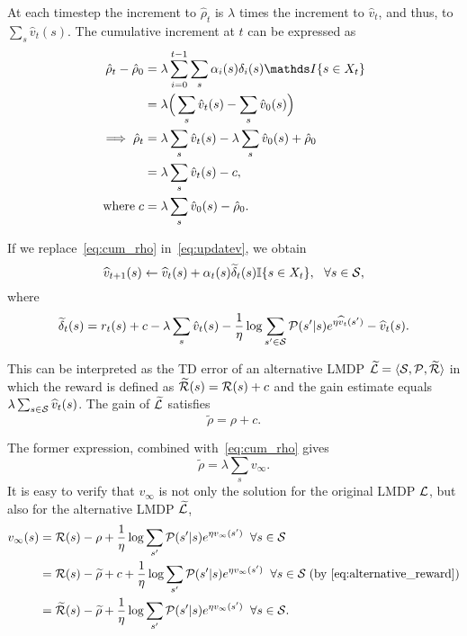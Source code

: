 At each timestep the increment to $\hat\rho_t$ is $\lambda$ times the increment to $\hat v_t$, and thus, to $\sum_s \hat v_t(s)$. The cumulative increment at $t$ can be expressed as
\begin{align}
     \hat\rho_t - \hat\rho_0 &= \lambda \sum_{i=0}^{t-1}\sum_s \alpha_i(s)\delta_i(s) \indicator{s\in X_t}\nonumber\\
                   &= \lambda \Big(\sum_s\hat v_t(s) - \sum_s\hat v_0 (s)\Big)\nonumber \\
    \implies \hat\rho_t &= \lambda \sum_s \hat v_t(s) - \lambda\sum_s \hat v_0 (s) + \hat\rho_0 \\
    &= \lambda\sum_s \hat v_t(s) - c, \label{eq:cum_rho}\\
    \text{where}\;c &= \lambda \sum_s \hat v_0(s) - \hat\rho_0.
\end{align}

If we replace~\ref{eq:cum_rho} in~\ref{eq:updatev}, we obtain
\begin{equation}
    \widehat{v}_{t+1}(s) \gets \widehat{v}_t(s) + \alpha_t(s) \widetilde\delta_t(s)  \mathbb{I}\{s\in X_t\},~~\forall{s\in\mathcal{S}},
    \label{eq:td_asynchronous_full}
\end{equation}
where
\begin{equation}
    \widetilde\delta_t(s) = r_t(s) + c - \lambda\sum_s \hat v_t(s) - \frac 1 \eta \log \sum_{s'\in\mathcal{S}} \mathcal{P}(s'|s) e^{\eta \widehat{v}_t(s')} - \widehat{v}_t(s).
\end{equation}

This can be interpreted as the TD error of an alternative LMDP $\widetilde{\mathcal{L}}=\langle\mathcal{S},\mathcal{P},\widetilde{\mathcal{R}}\rangle$ in which the reward is defined as $\widetilde{\mathcal{R}}(s) = \mathcal{R}(s) + c$ and the gain estimate equals $\lambda \sum_{s\in\mathcal{S}} \widehat{v}_t(s)$.
The gain of $\widetilde{\mathcal{L}}$ satisfies 
\begin{equation}
    \widetilde\rho = \rho + c.
    \label{eq:alternative_reward}
\end{equation}

The former expression, combined with~\eqref{eq:cum_rho} gives
\begin{equation}
    \widetilde\rho = \lambda \sum_s v_\infty.
    \label{eq:extended_rho}
\end{equation}
It is easy to verify that $v_\infty$ is not only the solution for the original LMDP $\mathcal{L}$, but also for the alternative LMDP $\widetilde{\mathcal{L}}$,
\begin{align*}
     v_\infty(s) &= \mathcal{R}(s) - \rho + \frac{1}{\eta} \log \sum_{s'} {\mathcal{P}(s'\lvert s) e^{\eta v_\infty(s')}}\;\;\forall s\in\mathcal{S}\\
     &= \mathcal{R}(s) - \widetilde\rho + c + \frac{1}{\eta} \log \sum_{s'} {\mathcal{P}(s'\lvert s) e^{\eta v_\infty(s')}}\;\;\forall s\in\mathcal{S}\;(\text{by}~\eqref{eq:alternative_reward})  \\
      &= \widetilde{\mathcal{R}}(s) - \widetilde\rho + \frac{1}{\eta} \log \sum_{s'} {\mathcal{P}(s'\lvert s) e^{\eta v_\infty(s')}}\;\;\forall s\in\mathcal{S}.
\end{align*}


